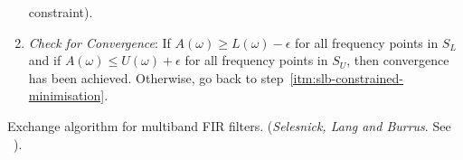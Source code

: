 \documentclass[a4paper,twoside,10pt,english]{report}
\begin{document}
\begin{algorithm}
\begin{enumerate}
  constraint).
\item \label{itm:slb-check-convergence}\emph{Check for Convergence}: If
  $A\left(\omega\right)\ge L\left(\omega\right)-\epsilon$
  for all frequency points in $S_{L}$ and if 
  $A\left(\omega\right)\le U\left(\omega\right)+\epsilon$
  for all frequency points in $S_{U}$, then convergence has been achieved.
  Otherwise, go back to step~\ref{itm:slb-constrained-minimisation}.
\end{enumerate}
\caption{\label{alg:Exchange-algorithm-for-multi-band-FIR-filters}Exchange
algorithm for multiband FIR filters. (\emph{Selesnick, Lang and Burrus}. See
~\cite[p.498]{SelesnickLangBurrus_ConstrainedLeastSquareMultiBandFIRFilters}).}
\end{algorithm}

\begin{comment}
\emph{Adams and Sullivan}
\cite[Section IV]{AdamsSullivan_PeakConstrainedLeastSquaresOptimization}
describe a so-called \emph{generalised multiple exchange }(GME) algorithm
for peak-constrained least-squares optimisation, shown in 
Algorithm~\ref{alg:Peak-Constrained-Least-Squares-Optimization} below. 
They distinguish between the inequality constraints that vary smoothly inside
of each frequency band and inequality constraints at the edges of frequency
bands. The GME algorithm includes the parameters $N_{DF}$, $INCR$
and $N_{KKT}$. $N_{DF}$ denotes the number of degrees of freedom.
$INCR$ denotes the limit on the increase in the number of constraints
in the active set $S_{A}$ from one iteration to the next. $N_{KKT}$
is used to control the number of constraints dropped in Step 2. Adams
and Sullivan recommend using $INCR=4+int\left(N_{DF}/8\right)$ and
$N_{KKT}=4+int\left(N_{DF}/16\right)$. The GME algorithm obtains
its initial guess in Step 0. It performs multiple exchanges in Step
1, and it performs single exchanges in Steps 2 and 3.

\begin{algorithm}
\bigskip{}
\emph{Step 0a)}\qquad{}Use the method of Lagrange multipliers to
minimize $\mathcal{E}_{A}$ subject to the set of equality constraints
$S_{E}$. If the solution is $0$, then go to Step 0b. Otherwise,
initialize $k=0$, $N_{A}=0$, $S_{A}=\emptyset$. Test for optimality
using the KKT conditions. Terminate if the solution is optimal. Else
compute $\mathcal{E}_{A}$ and go to Step 1.

\bigskip{}
\emph{Step 0b)}\qquad{}Select any inequality constraint that yields
a nonzero solution, put it into $S_{A}$, and use the method of Lagrange
multipliers to minimize $\mathcal{E}_{A}$ subject to $S_{E}$ and
$S_{A}$. (As an example of selecting a constraint corresponding to
a nonzero solution in a filter design problem, we can select a passband
edge frequency and activate the constraint corresponding to the minimum
passband gain specification. This allows us to get a nontrivial solution,
even when the passband squared-error weighting is zero.) Set $k=0$,
$N_{A}=1$. Test for optimality using the KKT conditions. Terminate
if the solution is optimal. Otherwise, compute $\mathcal{E}_{A}$
and go to Step 1.


\end{comment}
\end{document}
